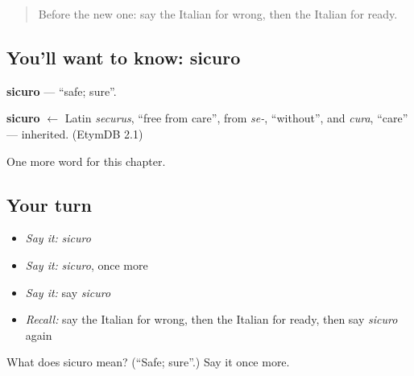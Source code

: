 \label{lesson:IT-C127-sicuro}



\begin{quote}
Before the new one: say the Italian for wrong, then the Italian for ready.
\end{quote}

\subsection*{You'll want to know: sicuro}
\textbf{sicuro} — \textquotedblleft{}safe; sure\textquotedblright{}.

\begin{cousinweb}
\textbf{sicuro} $\leftarrow$ Latin \emph{securus}, \textquotedblleft{}free from care\textquotedblright{}, from \emph{se-}, \textquotedblleft{}without\textquotedblright{}, and \emph{cura}, \textquotedblleft{}care\textquotedblright{} — inherited. (EtymDB 2.1)
\end{cousinweb}

\begin{grammarlens}[title={What you've built}]
One more word for this chapter.
\end{grammarlens}

\subsection*{Your turn}
\begin{itemize}
\raggedright
  \item \emph{Say it:} \emph{sicuro}
  \item \emph{Say it:} \emph{sicuro}, once more
  \item \emph{Say it:} say \emph{sicuro}
  \item \emph{Recall:} say the Italian for wrong, then the Italian for ready, then say \emph{sicuro} again
\end{itemize}

\begin{tcolorbox}[breakable,colback=teal!4,colframe=teal!35!black,title={Before you move on}]
What does sicuro mean? (\textquotedblleft{}Safe; sure\textquotedblright{}.) Say it once more.
\end{tcolorbox}
